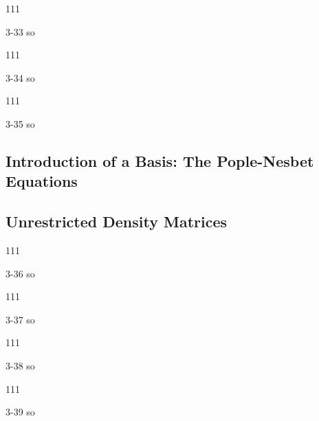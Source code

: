 \documentclass[a4paper]{book}
\begin{document}
	\begin{exercise}
	111
	\end{exercise}
	
	\begin{solution}
		3-33 so
	\end{solution}
	
	\begin{exercise}
	111
	\end{exercise}
	
	\begin{solution}
		3-34 so
	\end{solution}
	
	\begin{exercise}
	111
	\end{exercise}
	
	\begin{solution}
		3-35 so
	\end{solution}
	
	\subsection{Introduction of a Basis: The Pople-Nesbet Equations}
	
	\subsection{Unrestricted Density Matrices}
	\begin{exercise}
	111
	\end{exercise}
	
	\begin{solution}
		3-36 so
	\end{solution}
	
	\begin{exercise}
	111
	\end{exercise}
	
	\begin{solution}
		3-37 so
	\end{solution}
	
	\begin{exercise}
	111
	\end{exercise}
	
	\begin{solution}
		3-38 so
	\end{solution}
	
	\begin{exercise}
	111
	\end{exercise}
	
	\begin{solution}
		3-39 so
	\end{solution}
	
\end{document}
